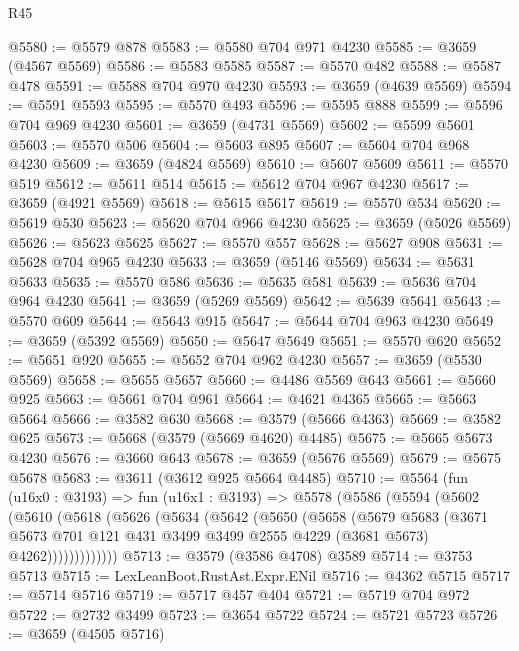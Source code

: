 \begin{lexlean}{R45}
\begin{coremodule}
@5580 := @5579 @878
@5583 := @5580 @704 @971 @4230
@5585 := @3659 (@4567 @5569)
@5586 := @5583 @5585
@5587 := @5570 @482
@5588 := @5587 @478
@5591 := @5588 @704 @970 @4230
@5593 := @3659 (@4639 @5569)
@5594 := @5591 @5593
@5595 := @5570 @493
@5596 := @5595 @888
@5599 := @5596 @704 @969 @4230
@5601 := @3659 (@4731 @5569)
@5602 := @5599 @5601
@5603 := @5570 @506
@5604 := @5603 @895
@5607 := @5604 @704 @968 @4230
@5609 := @3659 (@4824 @5569)
@5610 := @5607 @5609
@5611 := @5570 @519
@5612 := @5611 @514
@5615 := @5612 @704 @967 @4230
@5617 := @3659 (@4921 @5569)
@5618 := @5615 @5617
@5619 := @5570 @534
@5620 := @5619 @530
@5623 := @5620 @704 @966 @4230
@5625 := @3659 (@5026 @5569)
@5626 := @5623 @5625
@5627 := @5570 @557
@5628 := @5627 @908
@5631 := @5628 @704 @965 @4230
@5633 := @3659 (@5146 @5569)
@5634 := @5631 @5633
@5635 := @5570 @586
@5636 := @5635 @581
@5639 := @5636 @704 @964 @4230
@5641 := @3659 (@5269 @5569)
@5642 := @5639 @5641
@5643 := @5570 @609
@5644 := @5643 @915
@5647 := @5644 @704 @963 @4230
@5649 := @3659 (@5392 @5569)
@5650 := @5647 @5649
@5651 := @5570 @620
@5652 := @5651 @920
@5655 := @5652 @704 @962 @4230
@5657 := @3659 (@5530 @5569)
@5658 := @5655 @5657
@5660 := @4486 @5569 @643
@5661 := @5660 @925
@5663 := @5661 @704 @961
@5664 := @4621 @4365
@5665 := @5663 @5664
@5666 := @3582 @630
@5668 := @3579 (@5666 @4363)
@5669 := @3582 @625
@5673 := @5668 (@3579 (@5669 @4620) @4485)
@5675 := @5665 @5673 @4230
@5676 := @3660 @643
@5678 := @3659 (@5676 @5569)
@5679 := @5675 @5678
@5683 := @3611 (@3612 @925 @5664 @4485)
@5710 := @5564
    (fun (u16x0 : @3193) =>
    fun (u16x1 : @3193) =>
    @5578
      (@5586
        (@5594
          (@5602
            (@5610
              (@5618
                (@5626
                  (@5634
                    (@5642
                      (@5650
                        (@5658
                          (@5679
                            @5683
                            (@3671
                              @5673
                              @701
                              @121
                              @431
                              @3499
                              @3499
                              @2555
                              @4229
                              (@3681 @5673)
                              @4262)))))))))))))
@5713 := @3579 (@3586 @4708) @3589
@5714 := @3753 @5713
@5715 := LexLeanBoot.RustAst.Expr.ENil
@5716 := @4362 @5715
@5717 := @5714 @5716
@5719 := @5717 @457 @404
@5721 := @5719 @704 @972
@5722 := @2732 @3499
@5723 := @3654 @5722
@5724 := @5721 @5723
@5726 := @3659 (@4505 @5716)

\end{coremodule}
\end{lexlean}
